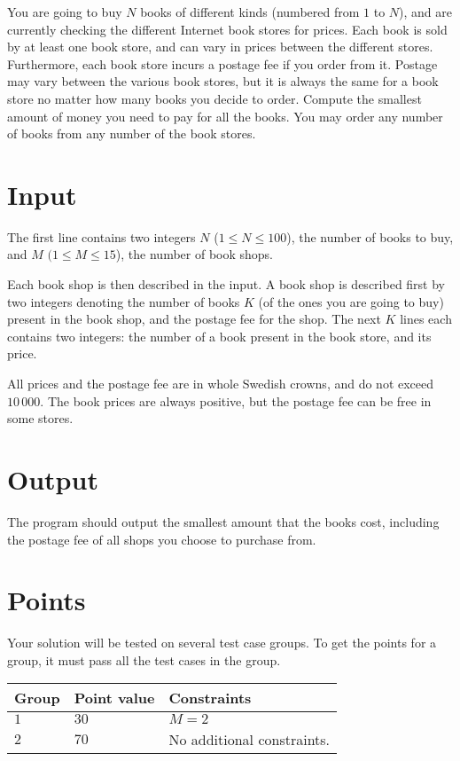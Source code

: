 You are going to buy $N$ books of different kinds (numbered from $1$ to $N$), and are currently checking the different Internet book stores for prices.
Each book is sold by at least one book store, and can vary in prices between the different stores.
Furthermore, each book store incurs a postage fee if you order from it.
Postage may vary between the various book stores, but it is always the same for a book store no matter how many books you decide to order.
Compute the smallest amount of money you need to pay for all the books.
You may order any number of books from any number of the book stores.

\section*{Input}
The first line contains two integers $N$ ($1 \le N \le 100$), the number of books to buy, and $M$ $(1 \le M \le 15$), the number of book shops.

Each book shop is then described in the input.
A book shop is described first by two integers denoting the number of books $K$ (of the ones you are going to buy) present in the book shop, and the postage fee for the shop.
The next $K$ lines each contains two integers: the number of a book present in the book store, and its price.

All prices and the postage fee are in whole Swedish crowns, and do not exceed $10\,000$.
The book prices are always positive, but the postage fee can be free in some stores.

\section*{Output}
The program should output the smallest amount that the books cost, including the postage fee of all shops you choose to purchase from.

\section*{Points}
Your solution will be tested on several test case groups.
To get the points for a group, it must pass all the test cases in the group.

\noindent
\begin{tabular}{| l | l | p{12cm} |}
  \hline
  \textbf{Group} & \textbf{Point value} & \textbf{Constraints} \\ \hline
  $1$    & $30$        & $M=2$ \\ \hline
  $2$    & $70$        & No additional constraints. \\ \hline
\end{tabular}
